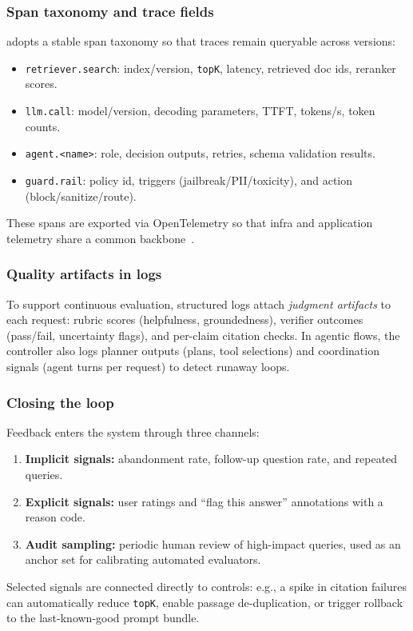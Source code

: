 \subsubsection{Span taxonomy and trace fields}
\ishtar{} adopts a stable span taxonomy so that traces remain queryable across versions:
\begin{itemize}
    \item \texttt{retriever.search}: index/version, \texttt{topK}, latency, retrieved doc ids, reranker scores.
    \item \texttt{llm.call}: model/version, decoding parameters, TTFT, tokens/s, token counts.
    \item \texttt{agent.<name>}: role, decision outputs, retries, schema validation results.
    \item \texttt{guard.rail}: policy id, triggers (jailbreak/PII/toxicity), and action (block/sanitize/route).
\end{itemize}
These spans are exported via OpenTelemetry so that infra and application telemetry share a common backbone~\cite{otel_spec}.

\subsubsection{Quality artifacts in logs}
To support continuous evaluation, structured logs attach \emph{judgment artifacts} to each request:
rubric scores (helpfulness, groundedness), verifier outcomes (pass/fail, uncertainty flags), and per-claim citation checks.
In agentic flows, the controller also logs planner outputs (plans, tool selections) and coordination signals (agent turns per request) to detect runaway loops.

\subsubsection{Closing the loop}
Feedback enters the system through three channels:
\begin{enumerate}[leftmargin=*]
    \item \textbf{Implicit signals:} abandonment rate, follow-up question rate, and repeated queries.
    \item \textbf{Explicit signals:} user ratings and ``flag this answer'' annotations with a reason code.
    \item \textbf{Audit sampling:} periodic human review of high-impact queries, used as an anchor set for calibrating automated evaluators.
\end{enumerate}
Selected signals are connected directly to controls: e.g., a spike in citation failures can automatically reduce \texttt{topK}, enable passage de-duplication, or trigger rollback to the last-known-good prompt bundle.

